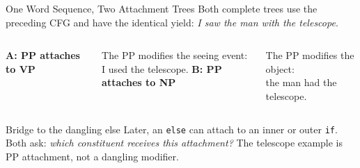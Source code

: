 \documentclass[10pt]{beamer}
\begin{document}
\begin{frame}{One Word Sequence, Two Attachment Trees}
  \small
  Both complete trees use the preceding CFG and have the identical yield:
  \emph{I saw the man with the telescope}.
  \begin{columns}[T]
    \centering
    \textbf{A: PP attaches to VP}\\[3pt]
    \par\smallskip
    The PP modifies the seeing event:\\I used the telescope.
    \centering
    \textbf{B: PP attaches to NP}\\[3pt]
    \par\smallskip
    The PP modifies the object:\\the man had the telescope.
  \end{columns}
  \pause
  \begin{block}{Bridge to the dangling else}
    Later, an \texttt{else} can attach to an inner or outer \texttt{if}.
    Both ask: \emph{which constituent receives this attachment?}
    The telescope example is PP attachment, not a dangling modifier.
  \end{block}
\end{frame}
\end{document}
